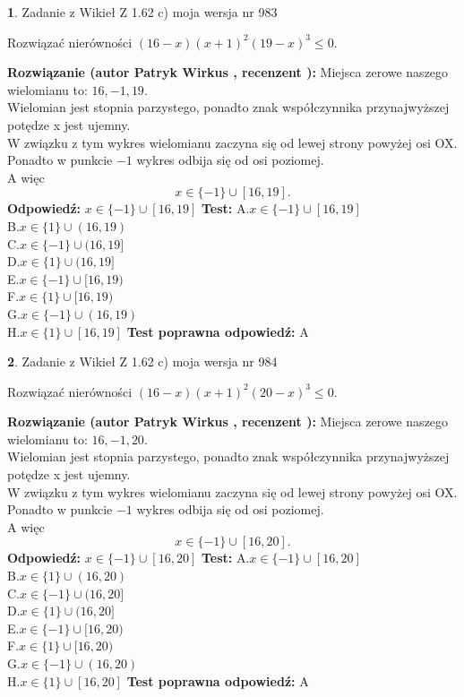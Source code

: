 \documentclass[12pt, a4paper]{article}
\theoremstyle{definition} %
\newtheorem{zad}{}
\newcommand{\zadStart}[1]{\begin{zad}#1\newline}
\newcommand{\zadStop}{\end{zad}}
\newcommand{\rozwStart}[2]{\noindent \textbf{Rozwiązanie (autor #1 , recenzent #2): }\newline}
\newcommand{\rozwStop}{\newline}
\newcommand{\odpStart}{\noindent \textbf{Odpowiedź:}\newline}
\newcommand{\odpStop}{\newline}
\newcommand{\testStart}{\noindent \textbf{Test:}\newline}
\newcommand{\testStop}{\newline}
\newcommand{\kluczStart}{\noindent \textbf{Test poprawna odpowiedź:}\newline}
\newcommand{\kluczStop}{\newline}
\begin{document}
\zadStart{Zadanie z Wikieł Z 1.62 c) moja wersja nr 983}

Rozwiązać nierówności $(16-x)(x+1)^{2}(19-x)^{3}\le0$.
\zadStop
\rozwStart{Patryk Wirkus}{}
Miejsca zerowe naszego wielomianu to: $16, -1, 19$.\\
Wielomian jest stopnia parzystego, ponadto znak współczynnika przy\linebreak najwyższej potędze x jest ujemny.\\ W związku z tym wykres wielomianu zaczyna się od lewej strony powyżej osi OX.\\
Ponadto w punkcie $-1$ wykres odbija się od osi poziomej.\\
A więc $$x \in \{-1\} \cup [16,19].$$
\rozwStop
\odpStart
$x \in \{-1\} \cup [16,19]$
\odpStop
\testStart
A.$x \in \{-1\} \cup [16,19]$\\
B.$x \in \{1\} \cup (16,19)$\\
C.$x \in \{-1\} \cup (16,19]$\\
D.$x \in \{1\} \cup (16,19]$\\
E.$x \in \{-1\} \cup [16,19)$\\
F.$x \in \{1\} \cup [16,19)$\\
G.$x \in \{-1\} \cup (16,19)$\\
H.$x \in \{1\} \cup [16,19]$
\testStop
\kluczStart
A
\kluczStop



\zadStart{Zadanie z Wikieł Z 1.62 c) moja wersja nr 984}

Rozwiązać nierówności $(16-x)(x+1)^{2}(20-x)^{3}\le0$.
\zadStop
\rozwStart{Patryk Wirkus}{}
Miejsca zerowe naszego wielomianu to: $16, -1, 20$.\\
Wielomian jest stopnia parzystego, ponadto znak współczynnika przy\linebreak najwyższej potędze x jest ujemny.\\ W związku z tym wykres wielomianu zaczyna się od lewej strony powyżej osi OX.\\
Ponadto w punkcie $-1$ wykres odbija się od osi poziomej.\\
A więc $$x \in \{-1\} \cup [16,20].$$
\rozwStop
\odpStart
$x \in \{-1\} \cup [16,20]$
\odpStop
\testStart
A.$x \in \{-1\} \cup [16,20]$\\
B.$x \in \{1\} \cup (16,20)$\\
C.$x \in \{-1\} \cup (16,20]$\\
D.$x \in \{1\} \cup (16,20]$\\
E.$x \in \{-1\} \cup [16,20)$\\
F.$x \in \{1\} \cup [16,20)$\\
G.$x \in \{-1\} \cup (16,20)$\\
H.$x \in \{1\} \cup [16,20]$
\testStop
\kluczStart
A
\kluczStop
\end{document}

